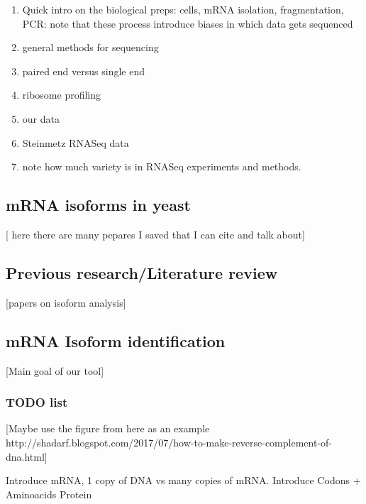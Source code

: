\documentclass[12pt]{article}
\begin{document}
\begin{enumerate}
    \item Quick intro on the biological preps: cells, mRNA isolation, fragmentation, PCR: note that these process introduce biases in which data gets sequenced
    \item general methods for sequencing
    \item paired end versus single end
    \item ribosome profiling
    \item our data
    \item Steinmetz RNASeq data
    \item note how much variety is in  RNASeq experiments and methods. 
\end{enumerate}

\subsection{mRNA isoforms in yeast}
 [ here there are many pepares I saved that I can cite and  talk about]



\subsection{Previous research/Literature review}
[papers on isoform analysis]

\subsection{mRNA Isoform  identification }
[Main goal of our tool]
\subsubsection{TODO list}

[Maybe use the figure from here as an example http://shadarf.blogspot.com/2017/07/how-to-make-reverse-complement-of-dna.html]

Introduce mRNA, 1 copy of DNA vs many copies of mRNA. 
Introduce Codons + Aminoacids 
Protein
\end{document}
